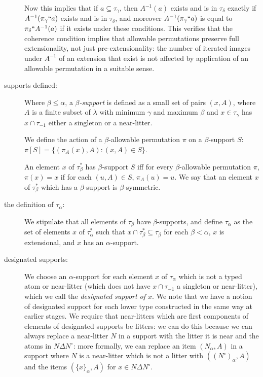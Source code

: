 \documentclass[112pt]{article}
\begin{document}
\begin{description}
Now this implies that if $a \subseteq \tau_\gamma$, then $A^{-1}(a)$ exists and is in $\tau_\delta$ exactly if $A^{-1}(\pi_\gamma``a)$ exists and is in $\tau_\delta$, and moreover $A^{-1}(\pi_\gamma``a)$ is equal to $\pi_\delta``A^{-1}(a)$ if it exists under these conditions.  This verifies that the coherence condition implies that allowable permutations preserve full extensionality, not just pre-extensionality:  the number of iterated images under $A^{-1}$ of an extension that exist is not affected by application of an allowable permutation in a suitable sense.

\item[supports defined:]  Where $\beta \leq \alpha$, a {\em $\beta$-support\/} is defined as a small set of pairs $(x,A)$, where $A$ is a finite subset of $\lambda$ with minimum $\gamma$ and maximum $\beta$ and $x \in \tau_\gamma$ has $x \cap \tau_{-1}$ either a singleton or a near-litter.

We define the action of a $\beta$-allowable permutation $\pi$ on a $\beta$-support $S$:  $\pi[S]= \{(\pi_A(x),A):(x,A) \in S\}$.

An element $x$ of $\tau^*_\beta$ has $\beta$-support $S$ iff for every $\beta$-allowable permutation $\pi$,  $\pi(x)=x$ if  for each $(u,A) \in S$,  $\pi_A(u) = u$.  We say that  an element $x$ of $\tau^*_\beta$ which has a $\beta$-support is $\beta$-symmetric.

\item[the definition of $\tau_\alpha$:]  We stipulate that all elements of $\tau_\beta$ have $\beta$-supports, and define $\tau_\alpha$ as the set of elements $x$ of $\tau^*_\alpha$ such that
$x \cap \tau^*_{\beta} \subseteq \tau_\beta$ for each $\beta<\alpha$, $x$ is extensional, and $x$ has an $\alpha$-support.

\item[designated supports:]  We choose an $\alpha$-support for each element $x$ of $\tau_\alpha$ which is not a typed atom or near-litter (which does not have $x \cap \tau_{-1}$ a singleton or near-litter), which we call the {\em designated support of $x$\/}.  We note that we have a notion of designated support for each lower type constructed in the same way at earlier stages.   We require that near-litters which are first components of elements of designated supports be litters:  we can do this because we can always replace a near-litter $N$ in a support with the litter it is near and the atoms in $N \Delta N^\circ$:  more formally, we can replace an item $(N_\alpha,A)$ in a support where $N$ is a near-litter which is not a litter with  $((N^\circ)_\alpha,A)$ and the items $(\{x\}_\alpha,A)$ for $x \in N \Delta N^\circ$.


\end{description}
\end{document}
